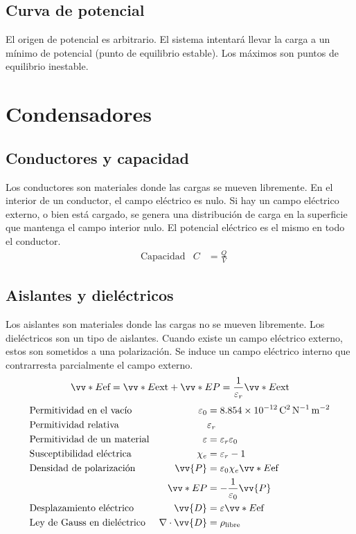 \documentclass[a4paper, 8pt]{extarticle}
\renewcommand{\vec}[1]{\vv{{#1}}}
\renewcommand{\grad}{\nabla}
\begin{document}
\begin{multicols}{3}
  \subsection{Curva de potencial}
  El origen de potencial es arbitrario. El sistema intentará llevar la carga a un mínimo de potencial (punto de equilibrio estable). Los máximos son puntos de equilibrio inestable.

  \section{Condensadores}
  \subsection{Conductores y capacidad}
  Los conductores son materiales donde las cargas se mueven libremente. En el interior de un conductor, el campo eléctrico es nulo. Si hay un campo eléctrico externo, o bien está cargado, se genera una distribución de carga en la superficie que mantenga el campo interior nulo. El potencial eléctrico es el mismo en todo el conductor.
  \begin{align*}
     & \text{Capacidad} & C & = \frac{Q}{V}
  \end{align*}
  \subsection{Aislantes y dieléctricos}
  Los aislantes son materiales donde las cargas no se mueven libremente. Los dieléctricos son un tipo de aislantes. Cuando existe un campo eléctrico externo, estos son sometidos a una polarización. Se induce un campo eléctrico interno que contrarresta parcialmente el campo externo.
  \[ \vv*{E}{\text{ef}} = \vv*{E}{\text{ext}} + \vv*{E}{P} = \frac{1}{\varepsilon_r} \vv*{E}{\text{ext}}\]
  \begin{align*}
     & \text{Permitividad en el vacío}    & \varepsilon_0       & = \SI{8.854e-12}{\coulomb\squared\per\newton\per\metre\squared} \\
     & \text{Permitividad relativa}       &                     & \varepsilon_r                                                   \\
     & \text{Permitividad de un material} & \varepsilon         & = \varepsilon_r \varepsilon_0                                   \\
     & \text{Susceptibilidad eléctrica}   & \chi _e             & = \varepsilon_r - 1                                             \\
     & \text{Densidad de polarización}    & \vec{P}             & = \varepsilon_0 \chi _e \vv*{E}{\text{ef}}                      \\
     &                                    & \vv*{E}{P}          & = - \frac{1}{\varepsilon_0}\vec{P}                              \\
     & \text{Desplazamiento eléctrico}    & \vec{D}             & = \varepsilon \vv*{E}{\text{ef}}                                \\
     & \text{Ley de Gauss en dieléctrico} & \grad \cdot \vec{D} & = \rho _{\text{libre}}
  \end{align*}


\end{multicols}
\end{document}
